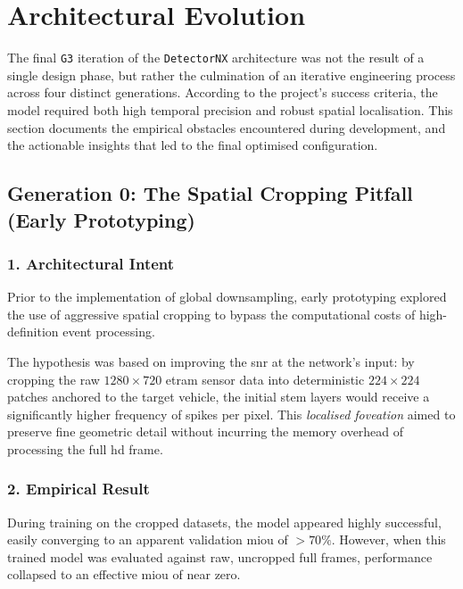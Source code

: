 \section{Architectural Evolution}
\label{sec:architectural_evolution}

The final \texttt{G3} iteration of the \texttt{DetectorNX} architecture was not the result of a single design phase,
but rather the culmination of an iterative engineering process across four distinct generations.
According to the project's success criteria, the model required both high temporal precision and robust spatial localisation.
This section documents the empirical obstacles encountered during development, and the actionable insights that led to the final optimised configuration.


\subsection{Generation 0: The Spatial Cropping Pitfall (Early Prototyping)}

\subsubsection*{1. Architectural Intent}

Prior to the implementation of global downsampling, early prototyping explored the use of aggressive spatial cropping to bypass the computational costs of high-definition event processing.

The hypothesis was based on improving the \gls{snr} at the network's input:
by cropping the raw $1280 \times 720$ \gls{etram} sensor data into deterministic $224 \times 224$ patches anchored to the target vehicle,
the initial stem layers would receive a significantly higher frequency of spikes per pixel.
%
This \textit{localised foveation} aimed to preserve fine geometric detail without incurring the memory overhead of processing the full \gls{hd} frame.

\subsubsection*{2. Empirical Result}
During training on the cropped datasets, the model appeared highly successful, 
easily converging to an apparent validation \gls{miou} of $> 70\%$.
%
However, when this trained model was evaluated against raw, uncropped full frames,
performance collapsed to an effective \gls{miou} of near zero.


